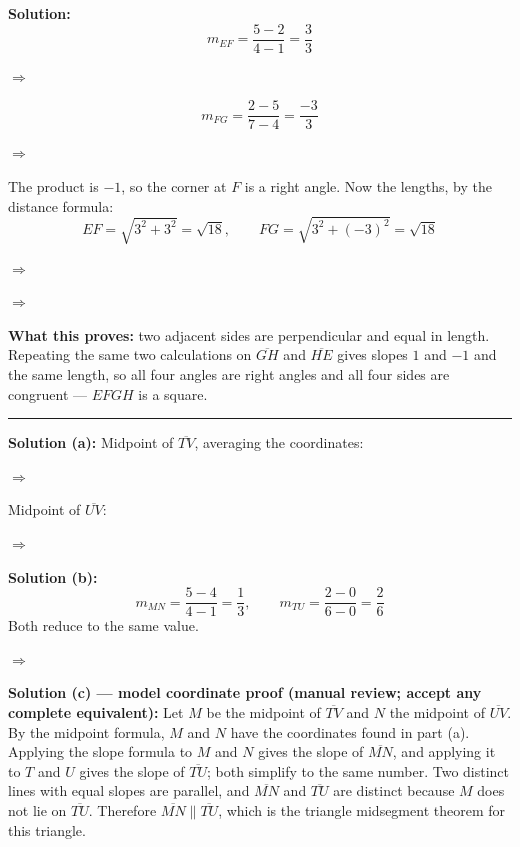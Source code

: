 \documentclass[12pt]{article}
\begin{document}
\textbf{Solution:}
\[ m_{EF} = \frac{5 - 2}{4 - 1} = \frac{3}{3} \]

$\Rightarrow$ 

\[ m_{FG} = \frac{2 - 5}{7 - 4} = \frac{-3}{3} \]

$\Rightarrow$ 

The product is $-1$, so the corner at $F$ is a right angle. Now the lengths, by the distance formula:
\[ EF = \sqrt{3^2 + 3^2} = \sqrt{18}, \qquad FG = \sqrt{3^2 + (-3)^2} = \sqrt{18} \]

$\Rightarrow$ 

$\Rightarrow$ 

\textbf{What this proves:} two adjacent sides are perpendicular and equal in length. Repeating the same two calculations on $\overline{GH}$ and $\overline{HE}$ gives slopes $1$ and $-1$ and the same length, so all four angles are right angles and all four sides are congruent --- $EFGH$ is a square.

\vspace{0.15cm}\noindent\rule{\linewidth}{0.2pt}


\textbf{Solution (a):} Midpoint of $\overline{TV}$, averaging the coordinates:

$\Rightarrow$ 

Midpoint of $\overline{UV}$:

$\Rightarrow$ 

\textbf{Solution (b):}
\[ m_{MN} = \frac{5 - 4}{4 - 1} = \frac{1}{3}, \qquad m_{TU} = \frac{2 - 0}{6 - 0} = \frac{2}{6} \]
Both reduce to the same value.

$\Rightarrow$ 

\textbf{Solution (c) --- model coordinate proof (manual review; accept any complete equivalent):}
Let $M$ be the midpoint of $\overline{TV}$ and $N$ the midpoint of $\overline{UV}$. By the midpoint formula, $M$ and $N$ have the coordinates found in part (a). Applying the slope formula to $M$ and $N$ gives the slope of $\overline{MN}$, and applying it to $T$ and $U$ gives the slope of $\overline{TU}$; both simplify to the same number. Two distinct lines with equal slopes are parallel, and $\overline{MN}$ and $\overline{TU}$ are distinct because $M$ does not lie on $\overline{TU}$. Therefore $\overline{MN} \parallel \overline{TU}$, which is the triangle midsegment theorem for this triangle.
\end{document}
